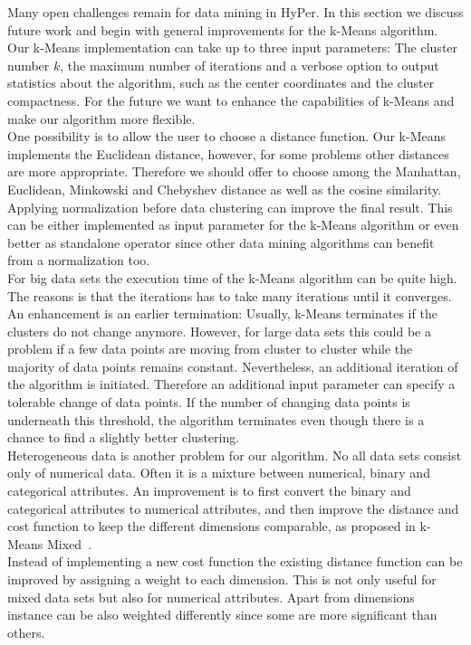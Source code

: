 Many open challenges remain for data mining in HyPer. In this section we discuss future work and begin with general improvements for the k-Means algorithm.
\\
Our k-Means implementation can take up to three input parameters: The cluster number $k$, the maximum number of iterations and a verbose option to output statistics about the algorithm, such as the center coordinates and the cluster compactness. For the future we want to enhance the capabilities of k-Means and make our algorithm more flexible. 
\\
One possibility is to allow the user to choose a distance function. Our k-Means implements the Euclidean distance, however, for some problems other distances are more appropriate. Therefore we should offer to choose among the Manhattan, Euclidean, Minkowski and Chebyshev distance as well as the cosine similarity.
\\
Applying normalization before data clustering can improve the final result. This can be either implemented as input parameter for the k-Means algorithm or even better as standalone operator since other data mining algorithms can benefit from a normalization too.
\\
For big data sets the execution time of the k-Means algorithm can be quite high. The reasons is that the iterations has to take many iterations until it converges. An enhancement is an earlier termination: Usually, k-Means terminates if the clusters do not change anymore. However, for large data sets this could be a problem if a few data points are moving from cluster to cluster while the majority of data points remains constant. Nevertheless, an additional iteration of the algorithm is initiated. Therefore an additional input parameter can specify a tolerable change of data points. If the number of changing data points is underneath this threshold, the algorithm terminates even though there is a chance to find a slightly better clustering.
\\
Heterogeneous data is another problem for our algorithm. No all data sets consist only of numerical data. Often it is a mixture between numerical, binary and categorical attributes. An improvement is to first convert the binary and categorical attributes to numerical attributes, and then improve the distance and cost function to keep the different dimensions comparable, as proposed in k-Means Mixed~\parencite{ahmad2007kmean}.
\\
Instead of implementing a new cost function the existing distance function can be improved by assigning a weight to each dimension. This is not only useful for mixed data sets but also for numerical attributes. Apart from dimensions instance can be also weighted differently since some are more significant than others.

